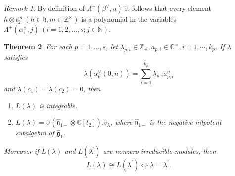 \documentclass[11pt]{amsproc}
\newtheorem{theorem}{Theorem}[section]
\theoremstyle{definition}
\theoremstyle{remark}
\newtheorem{remark}[theorem]{Remark}
\numberwithin{equation}{section} \errorcontextlines=0
\begin{document}
\begin{remark} By definition of
$\Lambda^{\pm}(\beta^{\vee},u)$ it follows that every element
$h\otimes t_2^{m}~(h\in\mathfrak{h}, m\in {\mathbb{Z}^{\times}})$
is a polynomial in the variables $\Lambda^{\pm}(\alpha_i^{\vee},j)~(i=1,2,\ldots,s; j\in\mathbb{N})$.
\end{remark}
\begin{theorem}\label{*}
For each $p=1, \ldots, s$, let $\lambda_{p,i}\in\mathbb Z_+,
 a_{p,i}\in\mathbb C^{\times}, i=1,\cdots, k_p$. If $\lambda$ satisfies
\begin{equation}\label{e:condition}
\lambda(\alpha_p^{\vee}(0,n))=\sum\limits_{i=1}^{k_p} \lambda_{p,i}
a_{p,i}^n
\end{equation}
and ${\lambda}(c_1)={\lambda}(c_2)=0$, then
\begin{enumerate}
\item $L(\lambda)$ is integrable.
\item $L(\lambda)=U(\hat{\mathfrak
n}_{1-}\otimes\mathbb{C}[t_2]).v_{\lambda}$, where
$\hat{\mathfrak n}_{1-}$ is the negative nilpotent subalgebra of
$\hat{\mathfrak g}_1$.
\end{enumerate}
Moreover if $L({\lambda})$
and $L({\lambda}^{'})$ are nonzero irreducible modules, then
\begin{equation}
L({\lambda})\cong L({\lambda}^{'})\Longleftrightarrow {\lambda}={\lambda}^{'}.
\end{equation} \end{theorem}
\end{document}
